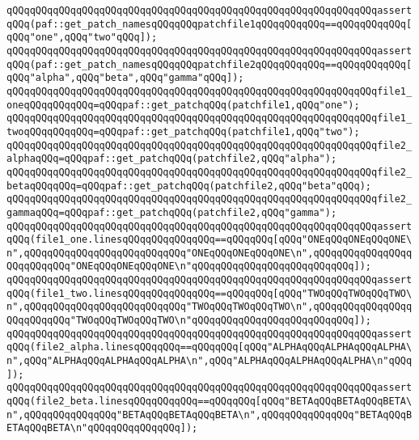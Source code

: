 \newline
\verb|qQQqqQQqqQQqqQQqqQQqqQQqqQQqqQQqqQQqqQQqqQQqqQQqqQQqqQQqqQQqqQQqassertqQQq(paf::get_patch_namesqQQqqQQqpatchfile1qQQqqQQqqQQq==qQQqqQQqqQQq[qQQq"one",qQQq"two"qQQq]);|\newline
\verb|qQQqqQQqqQQqqQQqqQQqqQQqqQQqqQQqqQQqqQQqqQQqqQQqqQQqqQQqqQQqqQQqassertqQQq(paf::get_patch_namesqQQqqQQqpatchfile2qQQqqQQqqQQq==qQQqqQQqqQQq[qQQq"alpha",qQQq"beta",qQQq"gamma"qQQq]);|\newline
\newline
\verb|qQQqqQQqqQQqqQQqqQQqqQQqqQQqqQQqqQQqqQQqqQQqqQQqqQQqqQQqqQQqqQQqfile1_oneqQQqqQQqqQQq=qQQqpaf::get_patchqQQq(patchfile1,qQQq"one");|\newline
\verb|qQQqqQQqqQQqqQQqqQQqqQQqqQQqqQQqqQQqqQQqqQQqqQQqqQQqqQQqqQQqqQQqfile1_twoqQQqqQQqqQQq=qQQqpaf::get_patchqQQq(patchfile1,qQQq"two");|\newline
\newline
\verb|qQQqqQQqqQQqqQQqqQQqqQQqqQQqqQQqqQQqqQQqqQQqqQQqqQQqqQQqqQQqqQQqfile2_alphaqQQq=qQQqpaf::get_patchqQQq(patchfile2,qQQq"alpha");|\newline
\verb|qQQqqQQqqQQqqQQqqQQqqQQqqQQqqQQqqQQqqQQqqQQqqQQqqQQqqQQqqQQqqQQqfile2_betaqQQqqQQq=qQQqpaf::get_patchqQQq(patchfile2,qQQq"beta"qQQq);|\newline
\verb|qQQqqQQqqQQqqQQqqQQqqQQqqQQqqQQqqQQqqQQqqQQqqQQqqQQqqQQqqQQqqQQqfile2_gammaqQQq=qQQqpaf::get_patchqQQq(patchfile2,qQQq"gamma");|\newline
\newline
\verb|qQQqqQQqqQQqqQQqqQQqqQQqqQQqqQQqqQQqqQQqqQQqqQQqqQQqqQQqqQQqqQQqassertqQQq(file1_one.linesqQQqqQQqqQQqqQQq==qQQqqQQq[qQQq"ONEqQQqONEqQQqONE\n",qQQqqQQqqQQqqQQqqQQqqQQqqQQq"ONEqQQqONEqQQqONE\n",qQQqqQQqqQQqqQQqqQQqqQQqqQQq"ONEqQQqONEqQQqONE\n"qQQqqQQqqQQqqQQqqQQqqQQqqQQq]);|\newline
\verb|qQQqqQQqqQQqqQQqqQQqqQQqqQQqqQQqqQQqqQQqqQQqqQQqqQQqqQQqqQQqqQQqassertqQQq(file1_two.linesqQQqqQQqqQQqqQQq==qQQqqQQq[qQQq"TWOqQQqTWOqQQqTWO\n",qQQqqQQqqQQqqQQqqQQqqQQqqQQq"TWOqQQqTWOqQQqTWO\n",qQQqqQQqqQQqqQQqqQQqqQQqqQQq"TWOqQQqTWOqQQqTWO\n"qQQqqQQqqQQqqQQqqQQqqQQqqQQq]);|\newline
\newline
\verb|qQQqqQQqqQQqqQQqqQQqqQQqqQQqqQQqqQQqqQQqqQQqqQQqqQQqqQQqqQQqqQQqassertqQQq(file2_alpha.linesqQQqqQQq==qQQqqQQq[qQQq"ALPHAqQQqALPHAqQQqALPHA\n",qQQq"ALPHAqQQqALPHAqQQqALPHA\n",qQQq"ALPHAqQQqALPHAqQQqALPHA\n"qQQq]);|\newline
\verb|qQQqqQQqqQQqqQQqqQQqqQQqqQQqqQQqqQQqqQQqqQQqqQQqqQQqqQQqqQQqqQQqassertqQQq(file2_beta.linesqQQqqQQqqQQq==qQQqqQQq[qQQq"BETAqQQqBETAqQQqBETA\n",qQQqqQQqqQQqqQQq"BETAqQQqBETAqQQqBETA\n",qQQqqQQqqQQqqQQq"BETAqQQqBETAqQQqBETA\n"qQQqqQQqqQQqqQQq]);|\newline
